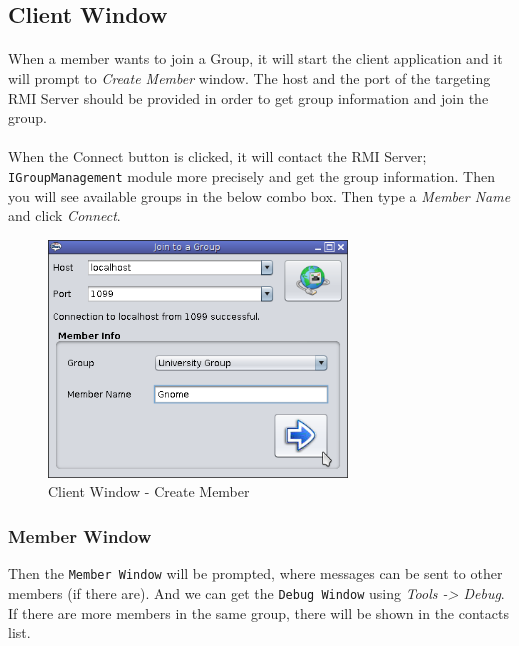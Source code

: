 \documentclass[a4paper,english,twoside]{article}
\begin{document}
\subsection{Client Window}
\paragraph{}
When a member wants to join a Group, it will start the client application and it will prompt to \textit{Create Member} window. The host and the port of the targeting RMI Server should be provided in order to get group information and join the group.

\paragraph{}
When the Connect button is clicked, it will contact the RMI Server; \texttt{IGroupManagement} module more precisely and get the group information. Then you will see available groups in the below combo box. Then type a \textit{Member Name} and click \textit{Connect}.

\begin{figure}[h]
\begin{center}
\includegraphics[width=300px]{Client-CreateMember.png}
\caption{Client Window - Create Member}
\end{center}
\end{figure}

\newpage
\subsubsection{Member Window}
\noindent
Then the \texttt{Member Window} will be prompted, where messages can be sent to other members (if there are). And we can get the \texttt{Debug Window} using \textit{Tools -> Debug}.
\noindent
If there are more members in the same group, there will be shown in the contacts list.
\end{document}
